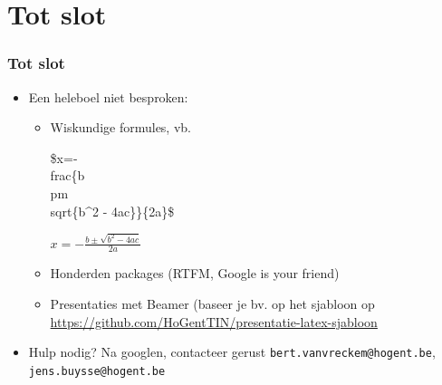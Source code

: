 \documentclass[aspectratio=169]{beamer}
\begin{document}
\section{Tot slot}

\begin{frame}
  \frametitle{Tot slot}
  
  \begin{itemize}
  \item Een heleboel niet besproken:
    \begin{itemize}
    \item<+-> Wiskundige formules, vb.
    \begin{semiverbatim}
    \$x=-\\frac\{b \\pm \\sqrt\{b\^{}2 - 4ac\}\}\{2a\}\$
    \end{semiverbatim}
    $x=-\frac{b \pm \sqrt{b^2 - 4ac}}{2a}$
    \item<+-> Honderden packages (RTFM, Google is your friend)
    \item<+-> Presentaties met Beamer (baseer je bv. op het sjabloon op \url{https://github.com/HoGentTIN/presentatie-latex-sjabloon}

    \end{itemize}
  \item<+-> Hulp nodig? Na googlen, contacteer gerust \texttt{bert.vanvreckem@hogent.be}, \texttt{jens.buysse@hogent.be}
  \end{itemize}
\end{frame}
\end{document}
